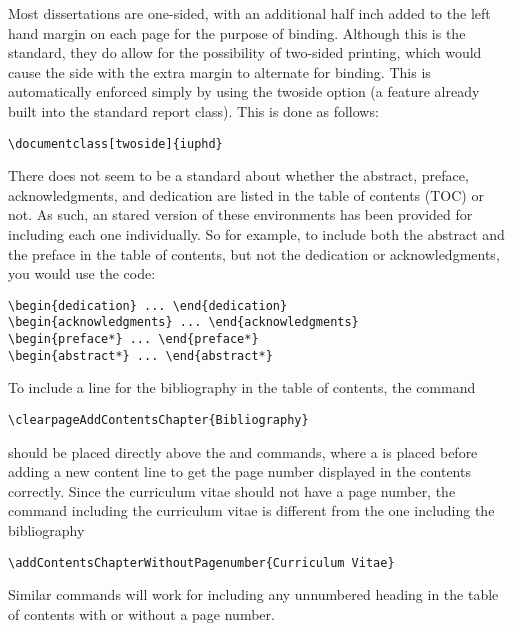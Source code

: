 Most dissertations are one-sided, with an additional half inch added to the left hand margin on each page for the purpose of binding.
Although this is the standard, they do allow for the possibility of two-sided printing, which would cause the side with the extra margin
to alternate for binding.  This is automatically enforced simply by using the twoside option (a feature already built into the
standard report class). This is done as follows:
\begin{verbatim}
\documentclass[twoside]{iuphd}
\end{verbatim}
There does not seem to be a standard about whether the abstract, preface, acknowledgments, and dedication are listed in the table of
contents (TOC) or not.  As such, an stared version of these environments has been provided for including each one individually.
So for example, to include
both the abstract and the preface in the table of contents, but not the dedication or acknowledgments, you would use the code:
\begin{verbatim}
\begin{dedication} ... \end{dedication}
\begin{acknowledgments} ... \end{acknowledgments}
\begin{preface*} ... \end{preface*}
\begin{abstract*} ... \end{abstract*}
\end{verbatim}
To include a line for the bibliography in the table of contents, the command
\begin{verbatim}
\clearpageAddContentsChapter{Bibliography}
\end{verbatim}
should be placed directly above the  and  commands,
where a  is placed before adding a new content line to get the page number displayed in the contents correctly.
Since the curriculum vitae should not have a page number, the command including the curriculum vitae is different from the one including the bibliography
\begin{verbatim}
\addContentsChapterWithoutPagenumber{Curriculum Vitae}
\end{verbatim}
Similar commands will work for including any unnumbered heading in the table of contents with or without a page number.

